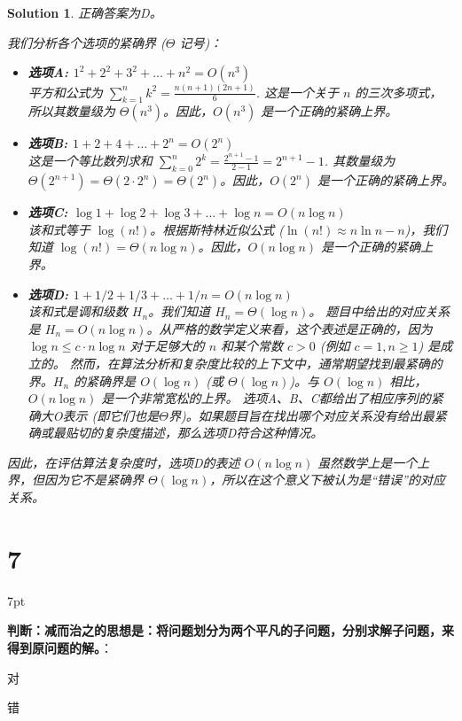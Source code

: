 \documentclass[UTF8]{report}
\newtheorem{solution}{Solution}
\theoremstyle{MyLineTheoremStyle} %
\theoremstyle{MyBlockTheoremStyle} %
\theoremstyle{MySubsubsectionStyle} %
\newenvironment{graybox}{%
        \def\FrameCommand{%
        \hspace{1pt}%
        {\color{gray}\small \vrule width 2pt}%
        {\color{graybox_color}\vrule width 4pt}%
        \colorbox{graybox_color}%
        }%
        \MakeFramed{\advance\hsize-\width\FrameRestore}%
        \noindent\hspace{-4.55pt}%
        \begin{adjustwidth}{}{7pt}%
        \vspace{2pt}\vspace{2pt}%
        }
        {%
        \vspace{2pt}\end{adjustwidth}\endMakeFramed%
        }
\begin{document}
\begin{solution}
正确答案为D。

我们分析各个选项的紧确界 ($\Theta$ 记号)：
\begin{itemize}
    \item \textbf{选项A: $1^2+2^2+3^2+\dots+n^2 = O(n^3)$} \\
    平方和公式为 $\sum_{k=1}^{n} k^2 = \frac{n(n+1)(2n+1)}{6}$. 这是一个关于 $n$ 的三次多项式，所以其数量级为 $\Theta(n^3)$。因此，$O(n^3)$ 是一个正确的紧确上界。
    \item \textbf{选项B: $1+2+4+\dots+2^n = O(2^n)$} \\
    这是一个等比数列求和 $\sum_{k=0}^{n} 2^k = \frac{2^{n+1}-1}{2-1} = 2^{n+1}-1$. 其数量级为 $\Theta(2^{n+1}) = \Theta(2 \cdot 2^n) = \Theta(2^n)$。因此，$O(2^n)$ 是一个正确的紧确上界。
    \item \textbf{选项C: $\log1+\log2+\log3+\dots+\log n = O(n\log n)$} \\
    该和式等于 $\log(n!)$。根据斯特林近似公式 ($\ln(n!) \approx n\ln n - n$)，我们知道 $\log(n!) = \Theta(n\log n)$。因此，$O(n\log n)$ 是一个正确的紧确上界。
    \item \textbf{选项D: $1+1/2+1/3+\dots+1/n = O(n\log n)$} \\
    该和式是调和级数 $H_n$。我们知道 $H_n = \Theta(\log n)$。
    题目中给出的对应关系是 $H_n = O(n\log n)$。从严格的数学定义来看，这个表述是正确的，因为 $\log n \le c \cdot n\log n$ 对于足够大的 $n$ 和某个常数 $c>0$ (例如 $c=1, n \ge 1$) 是成立的。
    然而，在算法分析和复杂度比较的上下文中，通常期望找到最紧确的界。$H_n$ 的紧确界是 $O(\log n)$ (或 $\Theta(\log n)$)。与 $O(\log n)$ 相比，$O(n\log n)$ 是一个非常宽松的上界。
    选项A、B、C都给出了相应序列的紧确大O表示 (即它们也是$\Theta$界)。如果题目旨在找出哪个对应关系没有给出最紧确或最贴切的复杂度描述，那么选项D符合这种情况。
\end{itemize}
因此，在评估算法复杂度时，选项D的表述 $O(n\log n)$ 虽然数学上是一个上界，但因为它不是紧确界 $\Theta(\log n)$，所以在这个意义下被认为是“错误”的对应关系。
\end{solution}

\section*{7}

\begin{graybox}
\textbf{判断：减而治之的思想是：将问题划分为两个平凡的子问题，分别求解子问题，来得到原问题的解。}：
\begin{circledenum}
    \item 对
    \item 错
\end{circledenum}
\end{graybox}
\end{document}
